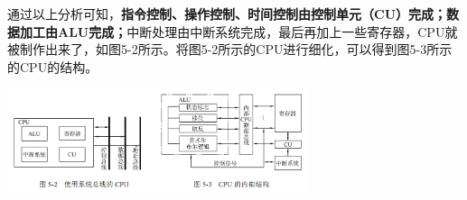 通过以上分析可知，\textbf{指令控制、操作控制、时间控制由控制单元（CU）完成；数据加工由ALU完成；}中断处理由中断系统完成，最后再加上一些寄存器，CPU就被制作出来了，如图5-2所示。将图5-2所示的CPU进行细化，可以得到图5-3所示的CPU的结构。

\includegraphics[width=3.46875in,height=1.20833in]{png-jpeg-pics/DB37517CDBD6E9C373DB0C3B587A5092.png}
